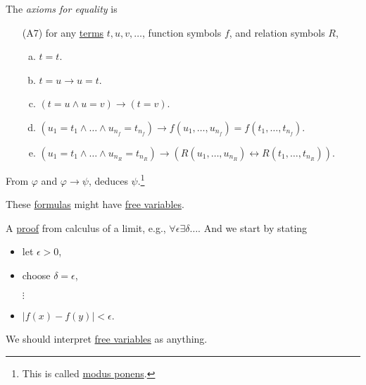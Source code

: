 \begin{definition}[Proof]
\begin{definition}
		\begin{definition}\label{def:axioms-for-equality}
			The \emph{axioms for equality} is
			\begin{enumerate}
				\item[(A7)] for any \hyperref[def:term]{terms} \(t, u, v, \ldots \), function symbols \(f\), and relation symbols \(R\),
					\begin{enumerate}[(a)]
						\item \(t = t\).
						\item \(t = u \to  u = t\).
						\item \((t=u \land u = v) \to  (t = v)\).
						\item \((u_1 = t_1 \land \ldots \land u_{n_f} = t_{n_f}) \to f(u_1, \ldots , u_{n_f}) = f(t_1, \ldots , t_{n_f})\).
						\item \((u_1 = t_1 \land \ldots \land u_{n_R} = t_{n_R}) \to (R(u_1, \ldots , u_{n_R}) \leftrightarrow R(t_1, \ldots , t_{n_R}))\).
					\end{enumerate}
			\end{enumerate}
		\end{definition}
	\end{definition}

	\begin{definition}\label{def:rule-of-inference}
		From \(\varphi \) and \(\varphi \to \psi\), deduces \(\psi \).\footnote{This is called \href{https://en.wikipedia.org/wiki/Modus_ponens}{modus ponens}.}
	\end{definition}
\end{definition}



These \hyperref[def:formula]{formulas} might have \hyperref[def:free-variable]{free variables}.

\begin{eg}
	A \hyperref[def:proof]{proof} from calculus of a limit, e.g., \(\forall \epsilon \exists \delta \ldots \). And we start by stating
	\begin{itemize}
		\item let \(\epsilon > 0\),
		\item choose \(\delta =\epsilon \),
		\item[] \(\vdots\)
		\item \(\vert f(x) - f(y) \vert < \epsilon \).
	\end{itemize}
	We should interpret \hyperref[def:free-variable]{free variables} as anything.
\end{eg}

